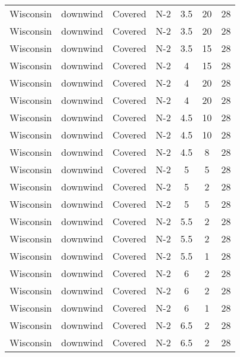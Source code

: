 \documentclass{article}
\begin{document}
\begin{longtable}[c]{ccccccc}
Wisconsin & downwind  & Covered     & N-2             & 3.5          & 20          & 28  \\
Wisconsin & downwind  & Covered     & N-2             & 3.5          & 20          & 28  \\
Wisconsin & downwind  & Covered     & N-2             & 3.5          & 15          & 28  \\
Wisconsin & downwind  & Covered     & N-2             & 4            & 15          & 28  \\
Wisconsin & downwind  & Covered     & N-2             & 4            & 20          & 28  \\
Wisconsin & downwind  & Covered     & N-2             & 4            & 20          & 28  \\
Wisconsin & downwind  & Covered     & N-2             & 4.5          & 10          & 28  \\
Wisconsin & downwind  & Covered     & N-2             & 4.5          & 10          & 28  \\
Wisconsin & downwind  & Covered     & N-2             & 4.5          & 8           & 28  \\
Wisconsin & downwind  & Covered     & N-2             & 5            & 5           & 28  \\
Wisconsin & downwind  & Covered     & N-2             & 5            & 2           & 28  \\
Wisconsin & downwind  & Covered     & N-2             & 5            & 5           & 28  \\
Wisconsin & downwind  & Covered     & N-2             & 5.5          & 2           & 28  \\
Wisconsin & downwind  & Covered     & N-2             & 5.5          & 2           & 28  \\
Wisconsin & downwind  & Covered     & N-2             & 5.5          & 1           & 28  \\
Wisconsin & downwind  & Covered     & N-2             & 6            & 2           & 28  \\
Wisconsin & downwind  & Covered     & N-2             & 6            & 2           & 28  \\
Wisconsin & downwind  & Covered     & N-2             & 6            & 1           & 28  \\
Wisconsin & downwind  & Covered     & N-2             & 6.5          & 2           & 28  \\
Wisconsin & downwind  & Covered     & N-2             & 6.5          & 2           & 28  \\

\end{longtable}
\end{document}
